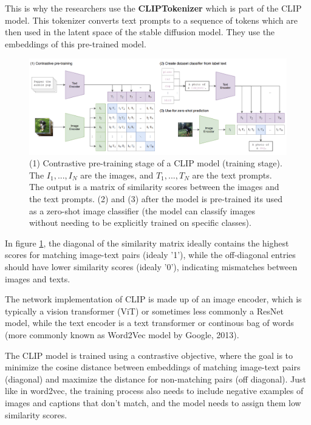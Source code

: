 This is why the researchers use the \textbf{CLIPTokenizer} which is part of the CLIP model. This tokenizer converts text prompts to a sequence of tokens which are then used in the latent space of the stable diffusion model. They use the embeddings of this pre-trained model.

\begin{figure}
    \centering
    \includegraphics[width=1\textwidth]{images/diffusion_models/stable_diffusion/clip.png}
    \caption{(1) Contrastive pre-training stage of a CLIP model \cite{openai_clip} (training stage). The $I_1, ..., I_N$ are the images, and $T_1, ..., T_N$ are the text prompts. The output is a matrix of similarity scores between the images and the text prompts. (2) and (3) after the model is pre-trained its used as a zero-shot image classifier (the model can classify images without needing to be explicitly trained on specific classes).}
    \label{fig:openai_clip}
\end{figure}

In figure \ref{fig:openai_clip}, the diagonal of the similarity matrix ideally contains the highest scores for matching image-text pairs (idealy '1'), while the off-diagonal entries should have lower similarity scores (idealy '0'), indicating mismatches between images and texts.

The network implementation of CLIP is made up of an image encoder, which is typically a vision transformer (ViT) \cite{vision_transformer} or sometimes less commonly a ResNet \cite{resnet} model, while the text encoder is a text transformer \cite{transformer} or continous bag of words \cite{cbow_word2vec} (more commonly known as Word2Vec model by Google, 2013).

The CLIP model is trained using a contrastive objective, where the goal is to minimize the cosine distance between embeddings of matching image-text pairs (diagonal) and maximize the distance for non-matching pairs (off diagonal). Just like in word2vec, the training process also needs to include negative examples of images and captions that don't match, and the model needs to assign them low similarity scores.














